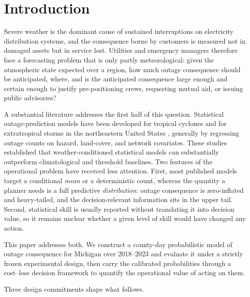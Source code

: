 \documentclass[10pt,twocolumn,letterpaper]{article}
\begin{document}
\section{Introduction}

Severe weather is the dominant cause of sustained interruptions on electricity
distribution systems, and the consequence borne by customers is measured not in
damaged assets but in service lost. Utilities and emergency managers therefore
face a forecasting problem that is only partly meteorological: given the
atmospheric state expected over a region, how much outage consequence should be
anticipated, where, and is the anticipated consequence large enough and certain
enough to justify pre-positioning crews, requesting mutual aid, or issuing
public advisories?

A substantial literature addresses the first half of this
question. Statistical outage-prediction models have been developed for tropical
cyclones \citep{guikema2014hurricane,nateghi2014outage} and for extratropical
storms in the northeastern United States
\citep{wanik2015storm,cerrai2019outages}, generally by regressing outage counts
on hazard, land-cover, and network covariates. These studies established that
weather-conditioned statistical models can substantially outperform
climatological and threshold baselines. Two features of the operational problem
have received less attention. First, most published models target a conditional
\emph{mean} or a deterministic count, whereas the quantity a planner needs is a
full predictive \emph{distribution}: outage consequence is zero-inflated and
heavy-tailed, and the decision-relevant information sits in the upper tail.
Second, statistical skill is usually reported without translating it into
decision value, so it remains unclear whether a given level of skill would have
changed any action.

This paper addresses both. We construct a county-day probabilistic model of
outage consequence for Michigan over 2018--2023 and evaluate it under a strictly
frozen experimental design, then carry the calibrated probabilities through a
cost--loss decision framework \citep{richardson2000value,zhu2002economicvalue}
to quantify the operational value of acting on them.

Three design commitments shape what follows.
\end{document}

